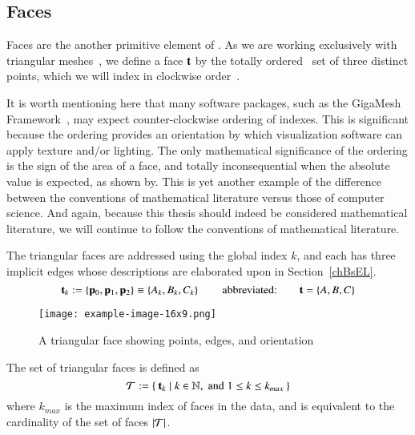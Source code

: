 \subsection{Faces}
\label{ch2s3ssF}
Faces are the another primitive element of \tdd{}. As we are working exclusively with triangular meshes~\cite[p.~26]{Mara12}, we define a face $\mathbf{t}$ by the totally ordered~\cite{Weisstein19a} set of three distinct points, which we will index in clockwise order~\cite[p.~4]{Mara17}.

It is worth mentioning here that many software packages, such as the GigaMesh Framework~\cite[p.~89]{Mara12}, may expect counter-clockwise ordering of indexes.  This is significant because the ordering provides an orientation by which visualization software can apply texture and/or lighting. The only mathematical significance of the ordering is the sign of the area of a face, and totally inconsequential when the absolute value is expected, as shown by\cite[p.~2]{Braden86}. This is yet another example of the difference between the conventions of mathematical literature versus those of computer science. And again, because this thesis should indeed be considered mathematical literature, we will continue to follow the conventions of mathematical literature.

The triangular faces are addressed using the global index $k$, and each has three implicit edges whose descriptions are elaborated upon in Section~\ref{chBsEL}.
\begin{equation}
	\mathbf{t}_k := \left \{\mathbf{p}_0, \mathbf{p}_1, \mathbf{p}_2\right \} \equiv \left \{A_k, B_k, C_k\right \} \hspace{20pt}\text{abbreviated:}\hspace{20pt} \mathbf{t} = \left \{A, B, C\right \}
	\label{eq:defineSetOfFaces}
\end{equation}%
%
%
\begin{figure}[]
\ffigbox
	{\texttt{[image: example-image-16x9.png]}}
	{\caption[A Triangular Face]{A triangular face showing points, edges, and orientation}\label{fig:facesOfAMesh}}
\end{figure}
%
The set of triangular faces is defined as
\begin{equation}
	\mathcal{T} := \left \{\:\mathbf{t}_k \mid k \in \mathbb{N}, \;\text{and}\; 1\leq k \leq k_{max}\:\right \}
	\label{eq:defineSetOfFaces}
\end{equation}
where $k_{max}$ is the maximum index of faces in the data, and is equivalent to the cardinality of the set of faces $|\mathcal{T}|$.%
%
%

